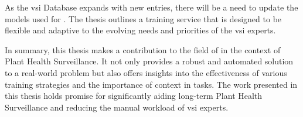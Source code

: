 As the \gls{vsi} Database expands with new entries, there will be a need to update the models used for \textclassification{}. The thesis outlines a training service that is designed to be flexible and adaptive to the evolving needs and priorities of the \gls{vsi} experts.

In summary, this thesis makes a contribution to the field of \textclassification{} in the context of Plant Health Surveillance. It not only provides a robust and automated solution to a real-world problem but also offers insights into the effectiveness of various training strategies and the importance of context in \textclassification{} tasks. The work presented in this thesis holds promise for significantly aiding long-term Plant Health Surveillance and reducing the manual workload of \gls{vsi} experts.


\clearpage